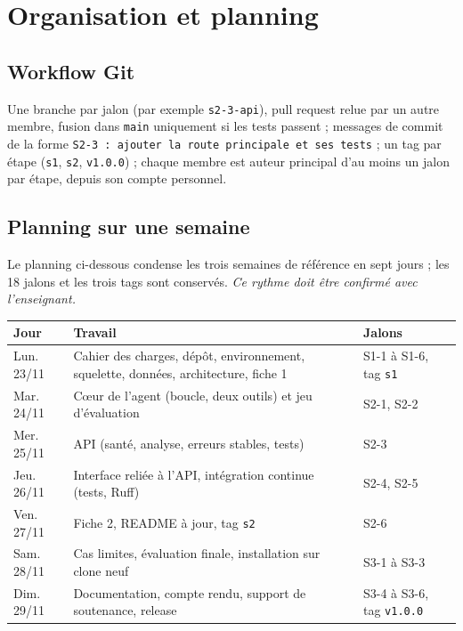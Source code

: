 \documentclass[11pt,a4paper]{article}
\newcommand{\code}[1]{\texttt{#1}}
\begin{document}
\section{Organisation et planning}
\subsection{Workflow Git}
Une branche par jalon (par exemple \code{s2-3-api}), pull request relue par un autre membre, fusion
dans \code{main} uniquement si les tests passent ; messages de commit de la forme
\code{S2-3 : ajouter la route principale et ses tests} ; un tag par étape (\code{s1}, \code{s2}, \code{v1.0.0}) ;
chaque membre est auteur principal d'au moins un jalon par étape, depuis son compte personnel.

\subsection{Planning sur une semaine}
Le planning ci-dessous condense les trois semaines de référence en sept jours ; les 18 jalons
et les trois tags sont conservés. \emph{Ce rythme doit être confirmé avec l'enseignant.}
\begin{longtable}{p{2.7cm}p{8cm}p{3.8cm}}
\toprule
\textbf{Jour} & \textbf{Travail} & \textbf{Jalons} \\
\midrule\endhead
Lun. 23/11 & Cahier des charges, dépôt, environnement, squelette, données, architecture, fiche 1 & S1-1 à S1-6, tag \code{s1} \\
Mar. 24/11 & Cœur de l'agent (boucle, deux outils) et jeu d'évaluation & S2-1, S2-2 \\
Mer. 25/11 & API (santé, analyse, erreurs stables, tests) & S2-3 \\
Jeu. 26/11 & Interface reliée à l'API, intégration continue (tests, Ruff) & S2-4, S2-5 \\
Ven. 27/11 & Fiche 2, README à jour, tag \code{s2} & S2-6 \\
Sam. 28/11 & Cas limites, évaluation finale, installation sur clone neuf & S3-1 à S3-3 \\
Dim. 29/11 & Documentation, compte rendu, support de soutenance, release & S3-4 à S3-6, tag \code{v1.0.0} \\
\bottomrule
\end{longtable}
\end{document}
